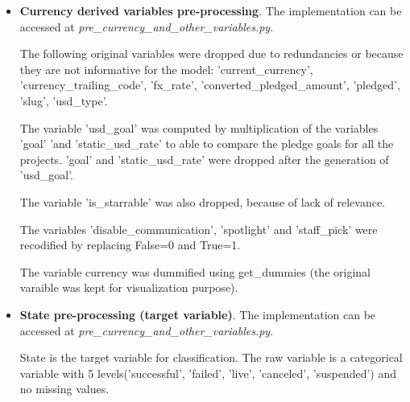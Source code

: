 \documentclass{article}
\begin{document}
{\begin{itemize}
    First, date and time coding variables ('created\_at', 'deadline', 'launched\_at', 'state\_changed\_at') in the raw data are in Unix time format and need to be transformed into datetime. The following variables where computed from the original ones: weekday columns for each date variable, month columns for each date variable, year columns for each date variable.
    
    'initial\_found\_rising\_duration' was computed as the difference in days between 'deadline' and 'launched\_at'.
    
    'found\_rising\_duration' was computed as the difference in days between 'state\_changed\_at' and 'launched\_at'.
    
    'project\_set\_up\_duration' was computed as the difference in days between 'launched\_at' and 'created\_at'.
    
    Date variables were prunned before model training to remove the 'state\_changed\_at' derived ones.
    
    \item \textbf{Currency derived variables pre-processing}.
    The implementation can be accessed at \emph{pre\_currency\_and\_other\_variables.py}.
    
    The following original variables were dropped due to redundancies or because they are not informative for the model: 'current\_currency', 'currency\_trailing\_code', 'fx\_rate', 'converted\_pledged\_amount', 'pledged', 'slug', 'usd\_type'.
    
    The variable 'usd\_goal' was computed by multiplication of the variables 'goal' 'and 'static\_usd\_rate' to able to compare the pledge goals for all the projects. 'goal' and 'static\_usd\_rate' were dropped after the generation of 'usd\_goal'.
    
    The variable 'is\_starrable' was also dropped, because of lack of relevance.
    
    The variables 'disable\_communication', 'spotlight' and 'staff\_pick' were recodified by replacing False=0 and True=1.
    
    The variable currency was dummified using get\_dummies (the original varaible was kept for visualization purpose).

    \item \textbf{State pre-processing (target variable)}.
    The implementation can be accessed at \emph{pre\_currency\_and\_other\_variables.py}.
    
    State is the target variable for classification. The raw variable is a categorical variable with 5 levels('successful', 'failed', 'live', 'canceled', 'suspended') and  no missing values.
    

\end{itemize}}
\end{document}
